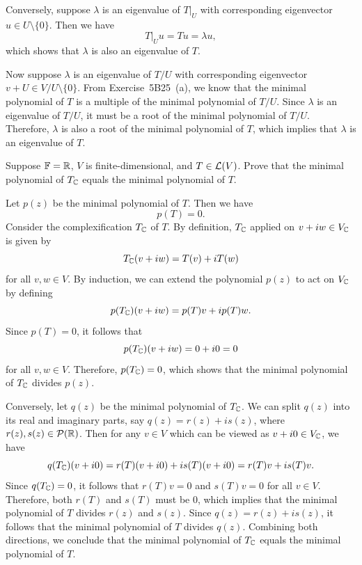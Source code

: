 \begin{exc}
\begin{solution}
Conversely, suppose $\lambda$ is an eigenvalue of $T|_U$ with corresponding
eigenvector $u\in U\setminus\{0\}$. Then we have
\[ T|_Uu=Tu=\lambda u, \]
which shows that $\lambda$ is also an eigenvalue of $T$.

Now suppose $\lambda$ is an eigenvalue of $T/U$ with corresponding eigenvector
$v+U\in V/U\setminus\{0\}$. From Exercise~5B25~(a), we know that the minimal
polynomial of $T$ is a multiple of the minimal polynomial of $T/U$. Since
$\lambda$ is an eigenvalue of $T/U$, it must be a root of the minimal
polynomial of $T/U$. Therefore, $\lambda$ is also a root of the minimal
polynomial of $T$, which implies that $\lambda$ is an eigenvalue of $T$.
\end{solution}

\begin{exercise}
Suppose $\mathbb{F}=\mathbb{R}$, $V$ is finite-dimensional, and $T\in\mathcal{L}(V)$. Prove that the
minimal polynomial of $T_{\mathbb{C}}$ equals the minimal polynomial of $T$.
\end{exercise}
\begin{solution}
Let $p(z)$ be the minimal polynomial of $T$. Then we have
\[ p(T)=0. \]
Consider the complexification $T_{\mathbb{C}}$ of $T$. By definition, $T_{\mathbb{C}}$
applied on $v+iw\in V_{\mathbb{C}}$ is given by
\[ T_{\mathbb{C}}(v+iw)=T(v)+iT(w) \]
for all $v,w\in V$. By induction, we can extend the polynomial $p(z)$ to act
on $V_{\mathbb{C}}$ by defining
\[ p(T_{\mathbb{C}})(v+iw)=p(T)v+ip(T)w. \]
Since $p(T)=0$, it follows that
\[ p(T_{\mathbb{C}})(v+iw)=0+i0=0 \]
for all $v,w\in V$. Therefore, $p(T_{\mathbb{C}})=0$, which shows that the minimal
polynomial of $T_{\mathbb{C}}$ divides $p(z)$.

Conversely, let $q(z)$ be the minimal polynomial of $T_{\mathbb{C}}$. We can split
$q(z)$ into its real and imaginary parts, say $q(z)=r(z)+is(z)$, where
$r(z),s(z)\in\mathcal{P}(\mathbb{R})$. Then for any $v\in V$ which can be viewed as
$v+i0\in V_{\mathbb{C}}$, we have
\[ q(T_{\mathbb{C}})(v+i0)=r(T)(v+i0)+is(T)(v+i0)=r(T)v+is(T)v. \]
Since $q(T_{\mathbb{C}})=0$, it follows that $r(T)v=0$ and $s(T)v=0$ for all $v\in V$.
Therefore, both $r(T)$ and $s(T)$ must be $0$, which implies that the minimal
polynomial of $T$ divides $r(z)$ and $s(z)$. Since $q(z)=r(z)+is(z)$, it
follows that the minimal polynomial of $T$ divides $q(z)$. Combining both
directions, we conclude that the minimal polynomial of $T_{\mathbb{C}}$ equals the
minimal polynomial of $T$.
\end{solution}


\end{exc}
